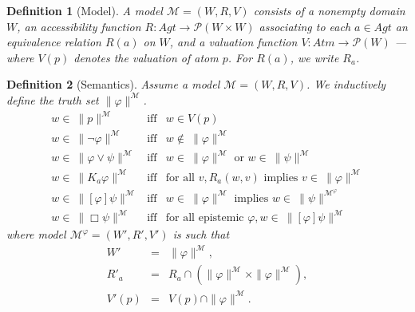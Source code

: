 \documentclass{article}[12pt]
\newtheorem{definition}{Definition}
\renewcommand{\phi}{\varphi}
\newcommand{\m}{{\mathcal M}}
\newcommand{\imp}{\rightarrow}
\newcommand{\powerset}{\mathcal P}
\begin{document}
\begin{definition}[Model] \label{def.model}
A model $\m = (W, R, V )$ consists of a nonempty {\em domain} $W$, an {\em accessibility function} $R: Agt \imp \powerset(W \times W)$ associating to each $a\in Agt$ an equivalence relation $R(a)$ on $W$, and a {\em valuation function} $V: Atm \imp \powerset(W)$ --- where $V(p)$ denotes the valuation of atom $p$.
For $R(a)$, we write $R_{a}$.
\end{definition}

\begin{definition}[Semantics]
Assume a model $\m = (W, R, V )$. We inductively define the truth set $\parallel \phi \parallel^{\m}$.
\[ \begin{array}{lcl}
w \in \ \parallel p \parallel^\m &\mbox{iff} & w \in V(p) \\ 
w \in \ \parallel \neg \phi\parallel^\m  &\mbox{iff} & w \not\in \ \parallel \phi \parallel^\m \\ 
w \in \ \parallel  \phi \vee \psi\parallel^\m  &\mbox{iff} &  w \in \ \parallel \phi  \parallel^\m \text{ or } w \in \ \parallel \psi  \parallel^\m  \\  
w \in \ \parallel K_{a} \phi\parallel^\m  &\mbox{iff} &  \text{for all } v, R_{a}(w,v) \text{ implies } v \in \ \parallel \phi \parallel^\m \\  
w \in \ \parallel  [\phi] \psi \parallel^\m &\mbox{iff} &  w \in \ \parallel \phi  \parallel^\m \text{ implies } w \in \ \parallel \psi \parallel ^{\m^\phi} \\
w \in \ \parallel  \Box \psi \parallel^\m &\mbox{iff} & \text{for all epistemic } \phi, w \in \ \parallel [\phi]\psi \parallel^\m 
\end{array} \] 
where model $\m^\phi = (W', R', V')$ is such that \[\begin{array}{lll} W' &=& \parallel \phi \parallel^\m, \\ R'_a &=& R_a \cap (\parallel\phi \parallel^\m \times \parallel\phi \parallel^\m), \\ V'(p) &=& V(p) \cap \parallel \phi \parallel^\m. \end{array} \]
\end{definition} 
\end{document}
